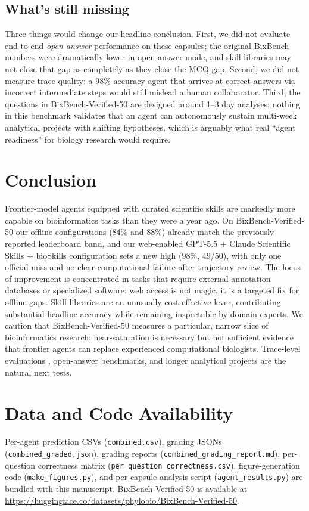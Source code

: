 \documentclass[11pt]{article}
\begin{document}
\subsection{What's still missing}

Three things would change our headline conclusion. First, we did not
evaluate end-to-end \emph{open-answer} performance on these capsules; the
original BixBench numbers were dramatically lower in open-answer mode,
and skill libraries may not close that gap as completely as they close
the MCQ gap. Second, we did not measure trace quality: a 98\% accuracy
agent that arrives at correct answers via incorrect intermediate steps
would still mislead a human collaborator. Third, the questions in
BixBench-Verified-50 are designed around 1--3 day analyses; nothing in
this benchmark validates that an agent can autonomously sustain
multi-week analytical projects with shifting hypotheses, which is
arguably what real ``agent readiness'' for biology research would
require.

\section{Conclusion}

Frontier-model agents equipped with curated scientific skills are
markedly more capable on bioinformatics tasks than they were a year ago.
On BixBench-Verified-50 our offline configurations (84\% and 88\%)
already match the previously reported leaderboard band, and our
web-enabled GPT-5.5 + Claude Scientific Skills + bioSkills configuration
sets a new high (98\%, 49/50), with only one official miss and no clear
computational failure after trajectory review. The locus of improvement is
concentrated in tasks that require external annotation databases or
specialized software: web access is not magic, it is a targeted fix for
offline gaps. Skill libraries are an unusually cost-effective lever,
contributing substantial headline accuracy while remaining inspectable by
domain experts. We caution that BixBench-Verified-50 measures a
particular, narrow slice of bioinformatics research; near-saturation is
necessary but not sufficient evidence that frontier agents can replace
experienced computational biologists. Trace-level evaluations
\citep{phylo2026,huang2025biomni}, open-answer benchmarks, and longer
analytical projects are the natural next tests.

\section*{Data and Code Availability}
Per-agent prediction CSVs (\texttt{combined.csv}), grading JSONs
(\texttt{combined\_graded.json}), grading reports
(\texttt{combined\_grading\_report.md}), per-question correctness
matrix (\texttt{per\_question\_correctness.csv}), figure-generation code
(\texttt{make\_figures.py}), and per-capsule analysis script
(\texttt{agent\_results.py}) are bundled with this manuscript.
BixBench-Verified-50 is available at
\url{https://huggingface.co/datasets/phylobio/BixBench-Verified-50}.
\end{document}
